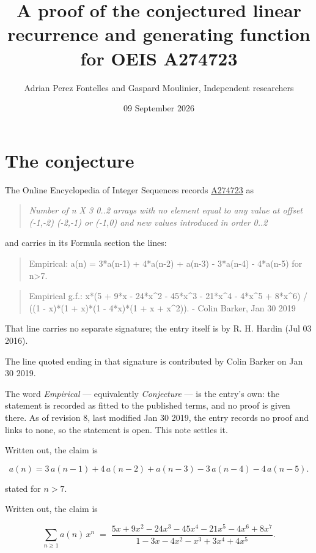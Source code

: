 \documentclass[11pt]{article}
\title{A proof of the conjectured linear recurrence and generating function for OEIS A274723}
\author{Adrian Perez Fontelles and Gaspard Moulinier, Independent researchers}
\date{09 September 2026}
\theoremstyle{definition}
\begin{document}
\maketitle
\section{The conjecture}

The Online Encyclopedia of Integer Sequences records \href{https://oeis.org/A274723}{A274723} as

\begin{quote}\itshape Number of n X 3 0..2 arrays with no element equal to any value at offset (-1,-2) (-2,-1) or (-1,0) and new values introduced in order 0..2\end{quote}

and carries in its Formula section the lines:

\begin{quote}\ttfamily Empirical: a(n) = 3*a(n-1) + 4*a(n-2) + a(n-3) - 3*a(n-4) - 4*a(n-5) for n>7.\end{quote}

\begin{quote}\ttfamily Empirical g.f.: x*(5 + 9*x - 24*x\textasciicircum{}2 - 45*x\textasciicircum{}3 - 21*x\textasciicircum{}4 - 4*x\textasciicircum{}5 + 8*x\textasciicircum{}6) / ((1 - x)*(1 + x)*(1 - 4*x)*(1 + x + x\textasciicircum{}2)). - Colin Barker, Jan 30 2019\end{quote}

That line carries no separate signature; the entry itself is by R. H. Hardin (Jul 03 2016).

The line quoted ending in that signature is contributed by Colin Barker on Jan 30 2019.

The word {\itshape Empirical} --- equivalently {\itshape Conjecture} --- is the entry's own: the statement is recorded as fitted to the published terms, and no proof is given there. As of revision 8, last modified Jan 30 2019, the entry records no proof and links to none, so the statement is open. This note settles it.

Written out, the claim is

\[a(n) = 3\,a(n-1) + 4\,a(n-2) + a(n-3) - 3\,a(n-4) - 4\,a(n-5).\]

stated for $n > 7$.

Written out, the claim is

\[\sum_{n \ge 1} a(n)\,x^n \;=\; \frac{5x + 9x^{2} - 24x^{3} - 45x^{4} - 21x^{5} - 4x^{6} + 8x^{7}}{1 - 3x - 4x^{2} - x^{3} + 3x^{4} + 4x^{5}}.\]
\end{document}
